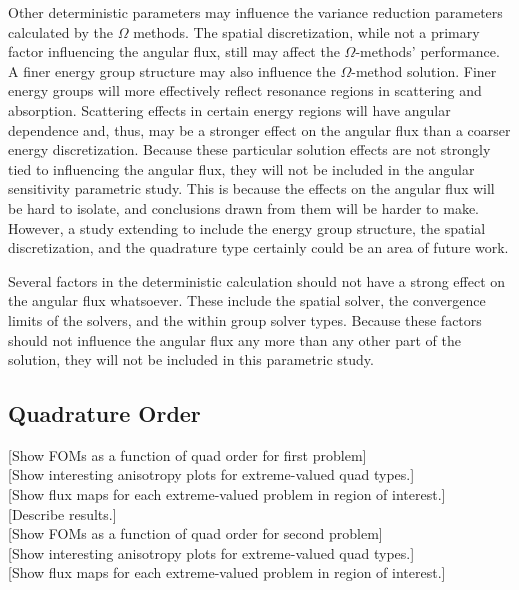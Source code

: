 Other deterministic parameters may influence the variance reduction parameters
calculated by the $\Omega$ methods.
The spatial discretization, while not a primary factor influencing
the angular flux, still may affect the $\Omega$-methods' performance.
A finer energy group structure may also influence the $\Omega$-method solution.
Finer energy groups will more effectively reflect resonance regions in
scattering and absorption. Scattering effects in certain energy regions will
have angular dependence and, thus, may be a stronger effect on the angular flux
than a coarser energy discretization. Because these particular solution effects
are not strongly tied to influencing the angular flux, they will not be included
in the angular sensitivity parametric study. This is because the effects on the
angular flux will be hard to isolate, and conclusions drawn
from them will be harder to make. However, a study extending to include the
energy group structure, the spatial discretization, and the quadrature type
certainly could be an area of future work.

Several factors in the deterministic calculation should not have a strong effect
on the angular flux whatsoever. These include the spatial solver, the
convergence limits of the solvers, and the within group solver types.
Because these factors should not influence the angular flux any more than any
other part of the solution, they will not be included in this parametric study.

\subsection{Quadrature Order}
\label{subsec:quadorder}
[Show FOMs as a function of quad order for first problem] \\

[Show interesting anisotropy plots for extreme-valued quad types.] \\

[Show flux maps for each extreme-valued problem in region of interest.] \\

[Describe results.] \\

[Show FOMs as a function of quad order for second problem] \\

[Show interesting anisotropy plots for extreme-valued quad types.] \\

[Show flux maps for each extreme-valued problem in region of interest.] \\

